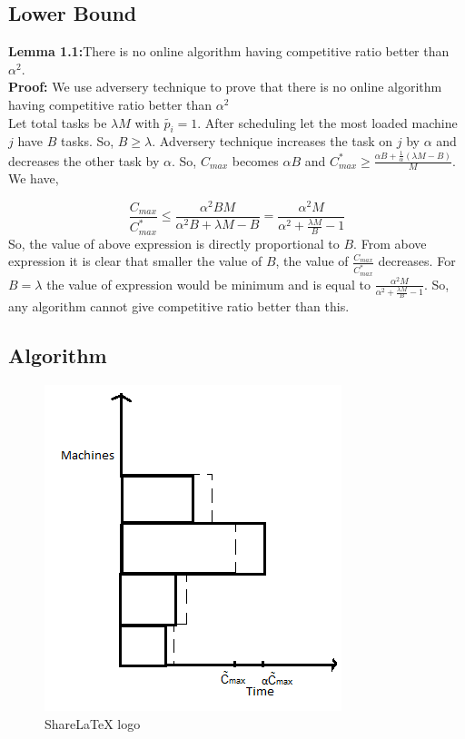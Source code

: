 \documentclass[10pt, conference, compsocconf]{IEEEtran}
\begin{document}
                                                                                      
\subsection{Lower Bound}
\textbf{Lemma 1.1:}There is no online algorithm having competitive  ratio better than $\alpha^{2} $.\\
\textbf{Proof:}  We  use adversery technique to prove that there is no online algorithm having competitive  ratio better than $\alpha^{2} $\\
 
 Let total tasks be $\lambda M$ with $\tilde{p_i}=1$. After scheduling let the most loaded machine $j$ have $B$ tasks. So, $B \geq \lambda$. Adversery technique increases the task on $j$ by $\alpha$ and decreases the other task by $\alpha$. So, $ C_{max}$ becomes $\alpha B$ and ${C^{*}_{max}}\geq \frac{\alpha B + \frac{1}{\alpha }  (\lambda  M - B) }{M}$. We have,
 
 \begin{equation}\nonumber
\frac{C_{max}}{C^{*}_{max}}\leq \frac{\alpha^{2} B M }{\alpha^{2} B + \lambda M - B}=\frac{\alpha^{2}  M }{\alpha^{2}  + \frac{\lambda M}{B}  - 1}
 \end{equation} 
 So, the value of above expression is directly proportional to $B$. From above expression it is clear that smaller the value of $B$, the value of $\frac{C_{max}}{C^{*}_{max}}$ decreases.  For $B= \lambda$ the value of expression would be minimum and is equal to $\frac{\alpha^{2}  M }{\alpha^{2}  + \frac{\lambda M}{B}  - 1}$. So, any algorithm   cannot give competitive ratio better than this.
 
 
 
\subsection{Algorithm}

\begin{figure}[htp]
\centering
\includegraphics[width= 4 cm]{fig1}
\caption{ShareLaTeX logo}
\label{fig:rara}
\end{figure}
\end{document}
